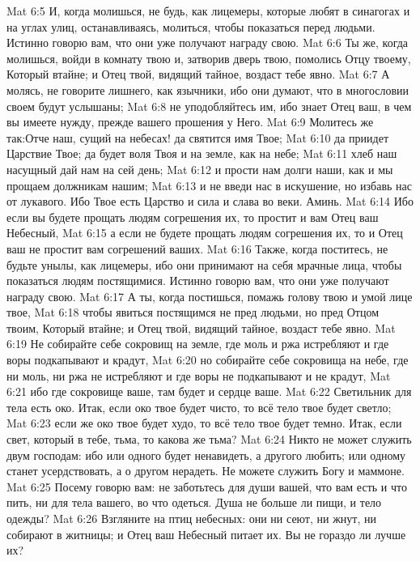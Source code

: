 \rsbpar\vs Mat 6:5 И, когда молишься, не будь, как лицемеры, которые любят в синагогах и на углах улиц, останавливаясь, молиться, чтобы показаться перед людьми. Истинно говорю вам, что они уже получают награду свою.
\vs Mat 6:6 Ты же, когда молишься, войди в комнату твою и, затворив дверь твою, помолись Отцу твоему, Который втайне; и Отец твой, видящий тайное, воздаст тебе явно.
\vs Mat 6:7 А молясь, не говорите лишнего, как язычники, ибо они думают, что в многословии своем будут услышаны;
\vs Mat 6:8 не уподобляйтесь им, ибо знает Отец ваш, в чем вы имеете нужду, прежде вашего прошения у Него.
\vs Mat 6:9 Молитесь же так:\rsbpar Отче наш, сущий на небесах! да святится имя Твое;
\vs Mat 6:10 да приидет Царствие Твое; да будет воля Твоя и на земле, как на небе;
\vs Mat 6:11 хлеб наш насущный дай нам на сей день;
\vs Mat 6:12 и прости нам долги наши, как и мы прощаем должникам нашим;
\vs Mat 6:13 и не введи нас в искушение, но избавь нас от лукавого. Ибо Твое есть Царство и сила и слава во веки. Аминь.
\rsbpar\vs Mat 6:14 Ибо если вы будете прощать людям согрешения их, то простит и вам Отец ваш Небесный,
\vs Mat 6:15 а если не будете прощать людям согрешения их, то и Отец ваш не простит вам согрешений ваших.
\rsbpar\vs Mat 6:16 Также, когда поститесь, не будьте унылы, как лицемеры, ибо они принимают на себя мрачные лица, чтобы показаться людям постящимися. Истинно говорю вам, что они уже получают награду свою.
\vs Mat 6:17 А ты, когда постишься, помажь голову твою и умой лице твое,
\vs Mat 6:18 чтобы явиться постящимся не пред людьми, но пред Отцом твоим, Который втайне; и Отец твой, видящий тайное, воздаст тебе явно.
\rsbpar\vs Mat 6:19 Не собирайте себе сокровищ на земле, где моль и ржа истребляют и где воры подкапывают и крадут,
\vs Mat 6:20 но собирайте себе сокровища на небе, где ни моль, ни ржа не истребляют и где воры не подкапывают и не крадут,
\vs Mat 6:21 ибо где сокровище ваше, там будет и сердце ваше.
\rsbpar\vs Mat 6:22 Светильник для тела есть око. Итак, если око твое будет чисто, то всё тело твое будет светло;
\vs Mat 6:23 если же око твое будет худо, то всё тело твое будет темно. Итак, если свет, который в тебе, тьма, то какова же тьма?
\rsbpar\vs Mat 6:24 Никто не может служить двум господам: ибо или одного будет ненавидеть, а другого любить; или одному станет усердствовать, а о другом нерадеть. Не можете служить Богу и маммоне.
\vs Mat 6:25 Посему говорю вам: не заботьтесь для души вашей, что вам есть и что пить, ни для тела вашего, во что одеться. Душа не больше ли пищи, и тело одежды?
\vs Mat 6:26 Взгляните на птиц небесных: они ни сеют, ни жнут, ни собирают в житницы; и Отец ваш Небесный питает их. Вы не гораздо ли лучше их?
